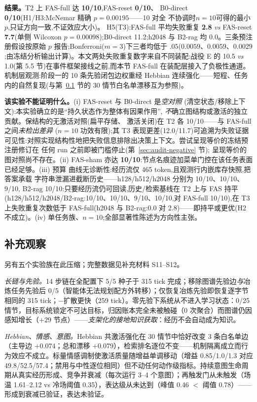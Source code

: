 \documentclass[10pt,a4paper]{ctexart}
\begin{document}
\textbf{结果。}T2 上 FAS-full 达 \textbf{10/10},FAS-reset \textbf{0/10}、
B0-direct \textbf{0/10}(H1/H3:McNemar 精确 $p{=}0.00195$——10 对全
不协调时$n{=}10$可得的最小 $p$,只证方向一致,不证效应大小)。
H5(T3):FAS-full 平均失败重复 \textbf{2.8} \emph{vs} FAS-reset
\textbf{7.7}(单侧 Wilcoxon $p{=}0.00098$);B0-direct 11.2;h2048 与 B2-rag 均 0.0。三条预注册假设按原始 $p$ 报告;Bonferroni($m{=}3$)下三者均低于 $.05$($0.0059$、$0.0059$、$0.0029$;由冻结分析输出计算)。本文两处失败重复数字来自不同装配:战役 E 的 10.5 \emph{vs} 1.0(第 5.5 节)在事件框架接线之前,而本节 FAS-full 在装配层接入了负极性通道。机制层观测:阶段一的 10 条先验闭包边权重经 Hebbian
连续强化——短程、任务内的自然复现(与第~\ref{sec:res-system} 节的
30 情节白名单漂移互为参照)。

\textbf{该实验不能证明什么。}(i) FAS-reset 与 B0-direct 是\emph{空对照}
(清空状态/移除上下文):本实验确立的是``持久状态作为整体有因果作用'',
\emph{不}确立图结构或激活的独立贡献。保结构的无激活对照(扁平存储、
激活关闭)在 T2 各 10/10——与 FAS-full 之间\emph{未检出差异}
($n{=}10$ 功效有限);其 T3 表现更差(12.0/11.7)可追溯为失败证据
可见性:对照实现结构性地把失败信息排除出决策上下文。尝试呈现等价的冻结预注册修订在
任何 run 之前即被门槛停止(第~\ref{sec:audit-negative} 节);
呈现等价的图对照尚不存在。(ii) FAS-sham 亦达
\textbf{10/10}:节点名痕迹加菜单门控在该任务表面已经足够。(iii) 预算
曲线无诊断性:经历流仅 465 token,且观测行内嵌库存快照,把答案承载
字符串泄漏进截断历史——h128/h512/h2048 分别为 10/10、10/10、9/10,
B2-rag 10/10:只要经历流仍可回读,历史/检索基线在 T2 上与 FAS 持平(h128/h512/h2048/B2-rag:10/10、10/10、9/10、10/10,对 FAS-full 10/10),在 T3 上失败重复次数低于 FAS-full(h2048 与 B2-rag:0.0 对 2.8)——即持平或更优(H2 不成立)。(iv) 单任务族、$n{=}10$;全部显著性陈述为方向性主张。

\subsection{补充观察}
\label{sec:res-system}
另有五个实验族在此压缩；完整数据见补充材料 S11--S12。

\emph{长链与先验。}14 步链在全配置下 5/5 种子于 315 tick 完成；移除图谱先验边\emph{与}冶炼任务先验后 0/5（智能体无法规划配方外转移）；仅恢复冶炼先验即恢复逐字节相同的 315 tick；$-$扩散更快（259 tick）。零先验下系统从不进入学习状态：0/25 情节，目标系统锁定不可达目标，归因账本完全未被触碰（0 次聚合）而图谱仍因感知增长（$+29$ 节点）——\emph{支架化的接地知识获取}：经历不会自动成为知识。

\emph{Hebbian、情感、意图。}Hebbian 共激活强化在 30 情节中恰好改变 3 条白名单边（主导边 $+0.074$；总和漂移 $+0.079$），检索排名逐位不变——机制隔离成立而行为效应不成立。标量情感调制使激活质量随增益单调移动（增益 0.85/1.0/1.3 对应 49.8/52.5/57.4；禁用与中性逐位相同）但不动任何动作级指标。持续意图生命周期从真实经历形成、竞争并衰减（每次运行 3--4 个意图）；再触发门从未触发（场温 1.61--2.12 vs 冷场阈值 0.35），表达级从未达到（峰值 0.46 $<$ 阈值 0.78）——形成到衰减已验证，表达未验证。
\end{document}

